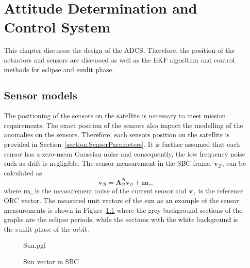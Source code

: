 \chapter{Attitude Determination and Control System}
\label{chap:ADCS}
This chapter discusses the design of the ADCS. Therefore, the position of the actuators and sensors are discussed as well as the EKF algorithm and control methods for eclipse and sunlit phase. 

\section{Sensor models}
\label{section:SensorModel}
The positioning of the sensors on the satellite is necessary to meet mission requirements. The exact position of the sensors also impact the modelling of the anomalies on the sensors. Therefore, each sensors position on the satellite is provided in Section~\ref{section:SensorParameters}. It is further assumed that each sensor has a zero-mean Gaussian noise and consequently, the low frequency noise such as drift is negligible. The sensor measurement in the SBC frame, $\mathbf{v}_{\mathcal{B}}$,  can be calculated as
\begin{equation}
\mathbf{v}_{\mathcal{B}} = \boldsymbol{A}^{\mathcal{B}}_{\mathcal{O}} \mathbf{v}_\mathcal{O} + \mathbf{m}_v,
\end{equation}
where $\mathbf{m}_v$ is the measurement noise of the current sensor and $\mathbf{v}_{\mathcal{I}}$ is the reference ORC vector. The measured unit vectors of the sun as an example of the sensor measurements is shown in Figure~\ref{fig:SunSensorPlot} where the grey background sections of the graphs are the eclipse periods, while the sections with the white background is the sunlit phase of the orbit.

\begin{figure}[!htb]
	\centering
	\def\pgfwidth{7cm}
	{Sun.pgf}
	
	\caption{Sun vector in SBC}
	\label{fig:SunSensorPlot}
\end{figure}

%	
%
%	

